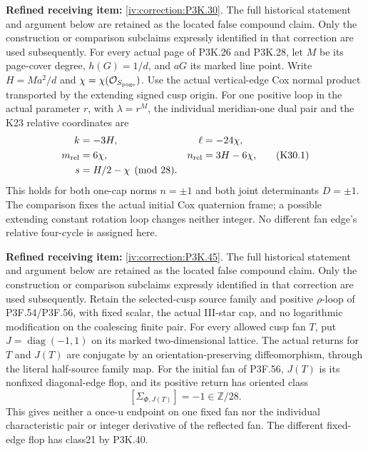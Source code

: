 \begin{theorem}\hypertarget{tag-02UB}{}\label{night:P3K.30}

\par\noindent\textbf{Refined receiving item:} \cref{iv:correction:P3K.30}. The full historical statement and argument below are retained as the located false compound claim. Only the construction or comparison subclaims expressly identified in that correction are used subsequently.
For every actual page of P3K.26 and P3K.28, let \(M\) be its page-cover degree,
\(h(G)=1/d\), and \(aG\) its marked line point. Write
\(H=Ma^2/d\) and \(\chi=\chi(\mathcal O_{S_{\rm page}})\).
Use the actual vertical-edge Cox normal product transported by the
extending signed cusp origin. For one positive loop in the actual
parameter \(r\), with \(\lambda=r^M\), the individual meridian-one dual pair and
the K23 relative coordinates are
\[
 \begin{aligned}
 k&=-3H,&\ell&=-24\chi,\\
 m_{\rm rel}&=6\chi,&n_{\rm rel}&=3H-6\chi,\\
 s&=H/2-\chi\pmod{28}.
 \end{aligned}\tag{K30.1}
\]
This holds for both one-cap norms \(n=\pm1\) and both joint determinants
\(D=\pm1\). The comparison fixes the actual initial Cox quaternion
frame; a possible extending constant rotation loop changes neither
integer. No different fan edge's relative four-cycle is assigned here.

\end{theorem}

\begin{theorem}\hypertarget{tag-02UQ}{}\label{night:P3K.45}

\par\noindent\textbf{Refined receiving item:} \cref{iv:correction:P3K.45}. The full historical statement and argument below are retained as the located false compound claim. Only the construction or comparison subclaims expressly identified in that correction are used subsequently.
Retain the selected-cusp source family and positive \(\rho\)-loop
of P3F.54/P3F.56, with fixed scalar, the actual III-star cap, and no
logarithmic modification on the coalescing finite pair. For every
allowed cusp fan \(T\), put \(J=\operatorname{diag}(-1,1)\)
on its marked two-dimensional lattice. The actual returns for
\(T\) and \(J(T)\) are conjugate by an orientation-preserving
diffeomorphism, through the literal half-source family map.
For the initial fan of P3F.56, \(J(T)\) is its nonfixed
diagonal-edge flop, and its positive return has oriented class
\[
                 [\Sigma_{\Phi,J(T)}]=-1\in\mathbb Z/28.
\]
This gives neither a once-u endpoint on one fixed fan nor the
individual characteristic pair or integer derivative of the
reflected fan. The different fixed-edge flop has class21 by
P3K.40.
\end{theorem}


